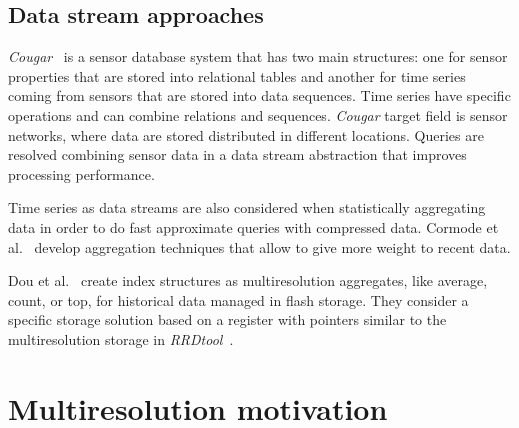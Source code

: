 \subsection{Data stream approaches}

\emph{Cougar}~\cite{bonnet01} is a sensor database system that has two
main structures: one for sensor properties that are stored into
relational tables and another for time series coming from sensors that
are stored into data sequences. Time series have specific operations
and can combine relations and sequences. \emph{Cougar} target field is
sensor networks, where data are stored distributed in different
locations. Queries are resolved combining sensor data in a data stream
abstraction that improves processing performance.

Time series as data streams are also considered when statistically
aggregating data in order to do fast approximate queries with
compressed data. Cormode et al.~\cite{cormode08:pods} develop
aggregation techniques that allow to give more weight to recent
data.  

Dou et al.~\cite{dou14:historic_queries_flash_storage} create index
structures as multiresolution aggregates, like average, count, or top,
for historical data managed in flash storage. They consider a specific
storage solution based on a register with pointers similar to the
multiresolution storage in \emph{RRDtool}~\cite{lisa98:oetiker}.



\section{Multiresolution motivation}
\label{sec:features}



